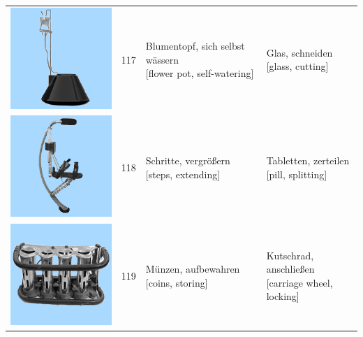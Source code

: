 \documentclass[
  english,
  doc,12pt,twoside,floatsintext]{apa7}
\begin{document}
\begin{center}
\begin{ThreePartTable}
{\begin{longtable}{llll}
\includegraphics[valign=c, scale=0.23]{../materials/unfamiliar/117.png} & 117 & \makecell[l]{Blumentopf, sich selbst wässern\\{[flower pot, self-watering]}} & \makecell[l]{Glas, schneiden\\{[glass, cutting]}}\\
\includegraphics[valign=c, scale=0.23]{../materials/unfamiliar/118.png} & 118 & \makecell[l]{Schritte, vergrößern\\{[steps, extending]}} & \makecell[l]{Tabletten, zerteilen\\{[pill, splitting]}}\\
\includegraphics[valign=c, scale=0.23]{../materials/unfamiliar/119.png} & 119 & \makecell[l]{Münzen, aufbewahren\\{[coins, storing]}} & \makecell[l]{Kutschrad, anschließen\\{[carriage wheel, locking]}}\\

\end{longtable}}
\end{ThreePartTable}
\end{center}
\end{document}
